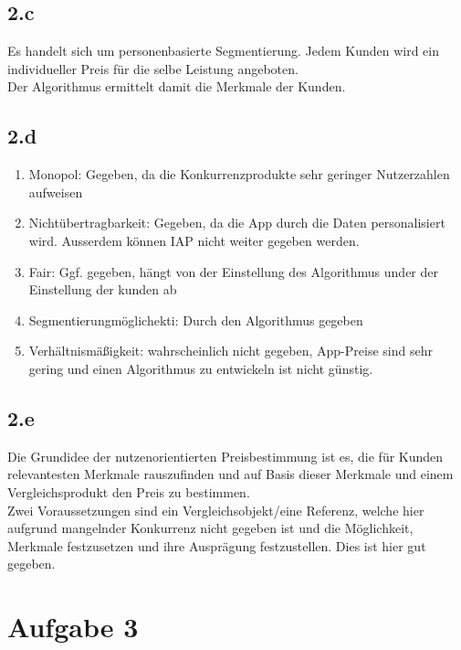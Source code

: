 \subsection{2.c}
    Es handelt sich um personenbasierte Segmentierung. Jedem Kunden wird ein individueller Preis für die selbe Leistung angeboten. \\
    Der Algorithmus ermittelt damit die Merkmale der Kunden.

\subsection{2.d}
    \begin{enumerate}
        \item Monopol: Gegeben, da die Konkurrenzprodukte sehr geringer Nutzerzahlen aufweisen
        \item Nichtübertragbarkeit: Gegeben, da die App durch die Daten personalisiert wird. Ausserdem können IAP nicht weiter gegeben werden.
        \item Fair: Ggf. gegeben, hängt von der Einstellung des Algorithmus under der Einstellung der kunden ab
        \item Segmentierungmöglichekti: Durch den Algorithmus gegeben
        \item Verhältnismäßigkeit: wahrscheinlich nicht gegeben, App-Preise sind sehr gering und einen Algorithmus zu entwickeln ist nicht günstig.
    \end{enumerate}

\subsection{2.e}
    Die Grundidee der nutzenorientierten Preisbestimmung ist es, die für Kunden relevantesten Merkmale rauszufinden und auf Basis dieser Merkmale und einem Vergleichsprodukt den Preis zu bestimmen. \\
    Zwei Voraussetzungen sind ein Vergleichsobjekt/eine Referenz, welche hier aufgrund mangelnder Konkurrenz nicht gegeben ist und die Möglichkeit, Merkmale festzusetzen und ihre Ausprägung festzustellen. Dies ist hier gut gegeben.


\section{Aufgabe 3}
